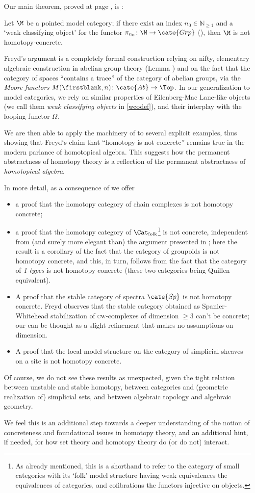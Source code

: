 Our main theorem, proved at page \pageref{ginnunga}, is
:
\begin{theorem*}
Let $\M$ be a pointed model category; if there exist an index $n_0 \in \mathbb{N}_{\ge
1}$ and a `weak classifying object' for the functor $\pi_{n_0} \colon \M \to
\cate{Grp}$ (\adef{}), then $\M$ is not homotopy\hyp{}concrete.
\end{theorem*}
Freyd's argument is a completely formal construction relying on nifty, elementary algebraic construction in abelian group theory (Lemma ) and on the fact that the category
of spaces ``contains a trace'' of the category of abelian groups, via the
\emph{Moore functors} $M(\firstblank,n) \colon \cate{Ab}\to \Top$. In our generalization to model categories, we rely on similar properties of Eilenberg-Mac Lane-like objects (we call them \emph{weak classifying objects} in \autoref{wcodef}), and their interplay with the looping functor $\Omega$.

We are then able to apply the machinery of \athm{} to several
explicit examples, thus showing that Freyd`s claim that ``homotopy is not
concrete'' remains true in the modern parlance of homotopical algebra. This
suggests how the permanent abstractness of homotopy theory is a reflection of
the permanent abstractness of \emph{homotopical algebra}.

In more detail, as a consequence of \athm{} we offer
\begin{itemize}
	\item a proof that the homotopy category of chain complexes is not homotopy concrete;
	\item a proof that the homotopy category of $\Cat_\text{folk}$\footnote{As
already mentioned, this is a shorthand to refer to the category of small
categories with its `folk' model structure having weak equivalences the
equivalences of categories, and cofibrations the functors injective on objects.}
is not concrete, independent from (and surely more elegant than) the argument
presented in \cite[§4.1]{fconc}; here the result is a corollary of the fact
that the category of groupoids is not homotopy concrete, and this, in turn,
follows from the fact that the category of \emph{1-types} is not homotopy
concrete (these two categories being Quillen equivalent).
	\item A proof that the stable category of spectra $\cate{Sp}$ is not homotopy
concrete. Freyd \cite{Freydconc} observes that the stable category obtained as
Spanier-Whitehead stabilization of \textsc{cw}-complexes of dimension $\ge 3$
can't be concrete; our  can be thought as a slight refinement
that makes no assumptions on dimension.
	\item A proof that the local model structure
\cite{jardine1987simplical,dugger2004hypercovers} on the category of simplicial
sheaves on a site is not homotopy concrete.
\end{itemize}
Of course, we do not see these results as unexpected, given the tight relation
between unstable and stable homotopy, between categories and (geometric
realization of) simplicial sets, and between algebraic topology and algebraic
geometry.

We feel this is an additional step towards a deeper understanding of the notion
of concreteness and foundational issues in homotopy theory, and an additional
hint, if needed, for how set theory and homotopy theory do (or do not)
interact.